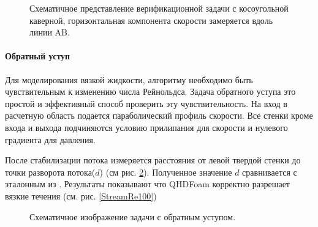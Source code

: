 \begin{figure}
\begin{subfigure}[b]{0.45\textwidth}
        \caption{}
    \end{subfigure}
    \caption{Схематичное представление верификационной задачи с косоугольной каверной, горизонтальная компонента скорости замеряется вдоль линии AB.}
    \label{fig:SCav}
\end{figure}

\paragraph{Обратный уступ}

Для моделирования вязкой жидкости, алгоритму необходимо быть чувствительным к изменению числа Рейнольдса. Задача обратного уступа это простой и эффективный способ проверить эту чувствительность. На вход в расчетную область подается параболический профиль скорости. Все стенки кроме входа и выхода подчиняются условию прилипания для скорости и нулевого градиента для давления. 

После стабилизации потока измеряется расстояния от левой твердой стенки до точки разворота потока($d$) (см рис. \ref{fig:backwardStepSketch}). Полученное значение $d$ сравнивается с эталонным из \cite{ElizarBook}. Результаты показывают что QHDFoam корректно разрешает вязкие течения (см. рис. \ref{StreamRe100})

\begin{figure}[!h]
    \centering
    \caption{Схематичное изображение задачи с обратным уступом.}
    \label{fig:backwardStepSketch}
\end{figure}

